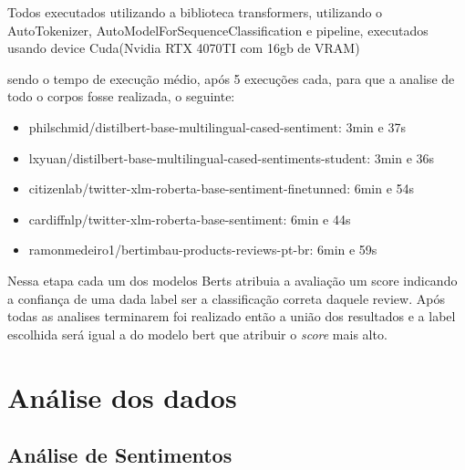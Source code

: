 Todos executados utilizando a biblioteca transformers, utilizando o AutoTokenizer, AutoModelForSequenceClassification e pipeline, executados usando device Cuda(Nvidia RTX 4070TI com 16gb de VRAM) %

sendo o tempo de execução médio, após 5 execuções cada, para que a analise de todo o corpos fosse realizada, o seguinte:

\begin{itemize}
	\item philschmid/distilbert-base-multilingual-cased-sentiment: 3min e 37s
	\item lxyuan/distilbert-base-multilingual-cased-sentiments-student: 3min e 36s
	\item citizenlab/twitter-xlm-roberta-base-sentiment-finetunned: 6min e 54s
	\item cardiffnlp/twitter-xlm-roberta-base-sentiment: 6min e 44s
	\item ramonmedeiro1/bertimbau-products-reviews-pt-br: 6min e 59s
\end{itemize}

Nessa etapa cada um dos modelos Berts atribuia a avaliação um score indicando a confiança de uma dada label ser a classificação correta daquele review. Após todas as analises terminarem foi realizado então a união dos resultados e a label escolhida será igual a do modelo bert que atribuir o \emph{score} mais alto.




\section{Análise dos dados}

\subsection{Análise de Sentimentos}
\label{subsec:analise_sentimentos}

